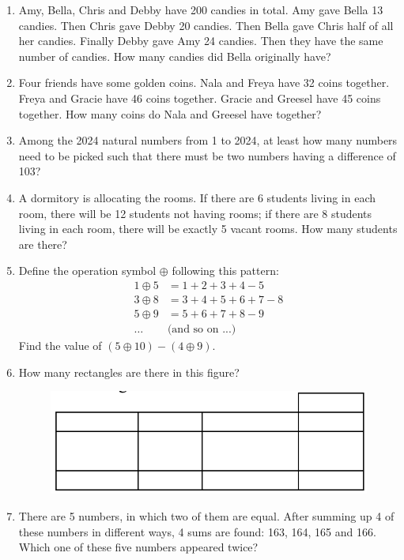 \documentclass[11pt]{scrartcl}
\begin{document}
\begin{enumerate}
    \vspace{10cm}\item Amy, Bella, Chris and Debby have 200 candies in total. Amy gave Bella 13 candies. Then Chris gave Debby 20 candies. Then Bella gave Chris half of all her candies. Finally Debby gave Amy 24 candies. Then they have the same number of candies. How many candies did Bella originally have?
    
    \vspace{10cm}\item Four friends have some golden coins. Nala and Freya have 32 coins together. Freya and Gracie have 46 coins together. Gracie and Greesel have 45 coins together. How many coins do Nala and Greesel have together?
    
    \vspace{10cm}\item Among the 2024 natural numbers from 1 to 2024, at least how many numbers need to be picked such that there must be two numbers having a difference of 103?
    
    \vspace{10cm}\item A dormitory is allocating the rooms. If there are 6 students living in each room, there will be 12 students not having rooms; if there are 8 students living in each room, there will be exactly 5 vacant rooms. How many students are there?

    \vspace{10cm}\item Define the operation symbol $\oplus$ following this pattern:
    \begin{align*}
        1 \oplus 5 &= 1 + 2 + 3 + 4 - 5\\
        3 \oplus 8 &= 3 + 4 + 5 + 6 + 7 - 8\\
        5 \oplus 9 &= 5 + 6 + 7 + 8 - 9\\
        \dots& \text{(and so on ...)}
    \end{align*}
    Find the value of $(5 \oplus 10) - (4 \oplus 9).$
    
    \vspace{10cm} \item How many rectangles are there in this figure?
    \begin{figure}[h]
        \centering
        \includegraphics{StarGen/AIMO Trial G3-4 2024/howmanyrect.png}
    \end{figure}
    
    \vspace{10cm}\item There are 5 numbers, in which two of them are equal. After summing up 4 of these numbers in different ways, 4 sums are found: 163, 164, 165 and 166. Which one of these five numbers appeared twice?
\end{enumerate}
\end{document}
